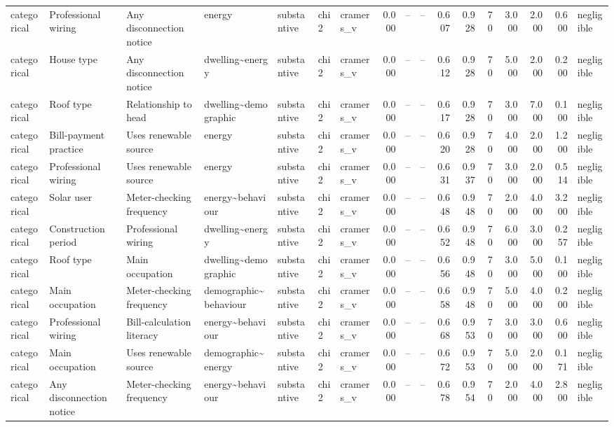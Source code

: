 \begin{table}
\begin{tabular}{lllllllrrrrrrrrrl}
categorical & Professional wiring & Any disconnection notice & energy & substantive & chi2 & cramers\_v & 0.000 & -- & -- & 0.607 & 0.928 & 70 & 3.000 & 2.000 & 0.600 & negligible \\
categorical & House type & Any disconnection notice & dwelling\textasciitilde energy & substantive & chi2 & cramers\_v & 0.000 & -- & -- & 0.612 & 0.928 & 70 & 5.000 & 2.000 & 0.200 & negligible \\
categorical & Roof type & Relationship to head & dwelling\textasciitilde demographic & substantive & chi2 & cramers\_v & 0.000 & -- & -- & 0.617 & 0.928 & 70 & 3.000 & 7.000 & 0.100 & negligible \\
categorical & Bill-payment practice & Uses renewable source & energy & substantive & chi2 & cramers\_v & 0.000 & -- & -- & 0.620 & 0.928 & 70 & 4.000 & 2.000 & 1.200 & negligible \\
categorical & Professional wiring & Uses renewable source & energy & substantive & chi2 & cramers\_v & 0.000 & -- & -- & 0.631 & 0.937 & 70 & 3.000 & 2.000 & 0.514 & negligible \\
categorical & Solar user & Meter-checking frequency & energy\textasciitilde behaviour & substantive & chi2 & cramers\_v & 0.000 & -- & -- & 0.648 & 0.948 & 70 & 2.000 & 4.000 & 3.200 & negligible \\
categorical & Construction period & Professional wiring & dwelling\textasciitilde energy & substantive & chi2 & cramers\_v & 0.000 & -- & -- & 0.652 & 0.948 & 70 & 6.000 & 3.000 & 0.257 & negligible \\
categorical & Roof type & Main occupation & dwelling\textasciitilde demographic & substantive & chi2 & cramers\_v & 0.000 & -- & -- & 0.656 & 0.948 & 70 & 3.000 & 5.000 & 0.100 & negligible \\
categorical & Main occupation & Meter-checking frequency & demographic\textasciitilde behaviour & substantive & chi2 & cramers\_v & 0.000 & -- & -- & 0.658 & 0.948 & 70 & 5.000 & 4.000 & 0.200 & negligible \\
categorical & Professional wiring & Bill-calculation literacy & energy\textasciitilde behaviour & substantive & chi2 & cramers\_v & 0.000 & -- & -- & 0.668 & 0.953 & 70 & 3.000 & 3.000 & 0.600 & negligible \\
categorical & Main occupation & Uses renewable source & demographic\textasciitilde energy & substantive & chi2 & cramers\_v & 0.000 & -- & -- & 0.672 & 0.953 & 70 & 5.000 & 2.000 & 0.171 & negligible \\
categorical & Any disconnection notice & Meter-checking frequency & energy\textasciitilde behaviour & substantive & chi2 & cramers\_v & 0.000 & -- & -- & 0.678 & 0.954 & 70 & 2.000 & 4.000 & 2.800 & negligible \\

\end{tabular}
\end{table}
